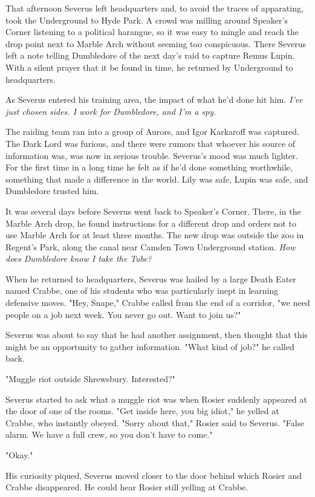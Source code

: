 That afternoon Severus left headquarters and, to avoid the traces of apparating, took the Underground to Hyde Park. A crowd was milling around Speaker's Corner listening to a political harangue, so it was easy to mingle and reach the drop point next to Marble Arch without seeming too conspicuous. There Severus left a note telling Dumbledore of the next day's raid to capture Remus Lupin. With a silent prayer that it be found in time, he returned by Underground to headquarters.

As Severus entered his training area, the impact of what he'd done hit him. \emph{I've just chosen sides. I work for Dumbledore, and I'm a spy.}

The raiding team ran into a group of Aurors, and Igor Karkaroff was captured. The Dark Lord was furious, and there were rumors that whoever his source of information was, was now in serious trouble. Severus's mood was much lighter. For the first time in a long time he felt as if he'd done something worthwhile, something that made a difference in the world. Lily was safe, Lupin was safe, and Dumbledore trusted him.

It was several days before Severus went back to Speaker's Corner. There, in the Marble Arch drop, he found instructions for a different drop and orders not to use Marble Arch for at least three months. The new drop was outside the zoo in Regent's Park, along the canal near Camden Town Underground station. \emph{How does Dumbledore know I take the Tube?}

When he returned to headquarters, Severus was hailed by a large Death Eater named Crabbe, one of his students who was particularly inept in learning defensive moves. "Hey, Snape," Crabbe called from the end of a corridor, "we need people on a job next week. You never go out. Want to join us?"

Severus was about to say that he had another assignment, then thought that this might be an opportunity to gather information. "What kind of job?" he called back.

"Muggle riot outside Shrewsbury. Interested?"

Severus started to ask what a muggle riot was when Rosier suddenly appeared at the door of one of the rooms. "Get inside here, you big idiot," he yelled at Crabbe, who instantly obeyed. "Sorry about that," Rosier said to Severus. "False alarm. We have a full crew, so you don't have to come."

"Okay."

His curiosity piqued, Severus moved closer to the door behind which Rosier and Crabbe disappeared. He could hear Rosier still yelling at Crabbe.

